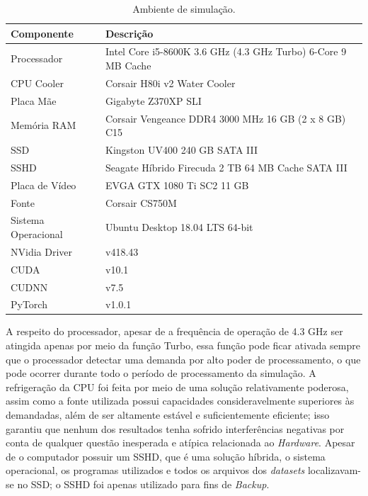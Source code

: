 \begin{table}[H]
    \centering
    \caption{Ambiente de simulação.}
    \begin{tabular}{ll}
        \toprule
        \textbf{Componente} &   \textbf{Descrição}\\
        \midrule
        Processador         &   Intel Core i5-8600K 3.6 GHz (4.3 GHz Turbo) 6-Core 9 MB Cache\\
        \hline
        CPU Cooler          &   Corsair H80i v2 Water Cooler\\
        \hline
        Placa Mãe           &   Gigabyte Z370XP SLI\\
        \hline
        Memória RAM         &   Corsair Vengeance DDR4 3000 MHz 16 GB (2 
        x 8 GB) C15\\
        \hline
        SSD                 &   Kingston UV400 240 GB SATA III\\
        \hline
        SSHD                &   Seagate Híbrido Firecuda 2 TB 64 MB Cache 
        SATA III\\
        \hline
        Placa de Vídeo      &   EVGA GTX 1080 Ti SC2 11 GB\\
        \hline
        Fonte               &   Corsair CS750M\\
        \hline
        Sistema Operacional &   Ubuntu Desktop 18.04 LTS 64-bit\\
        \hline
        NVidia Driver       &   v418.43\\
        \hline
        CUDA                &   v10.1\\
        \hline
        CUDNN               &   v7.5\\
        \hline
        PyTorch             &   v1.0.1\\
        \bottomrule
    \end{tabular}
    \label{tab:results_pc_specs}
\end{table}

A respeito do processador, apesar de a frequência de operação de 4.3 GHz ser atingida apenas por meio da função Turbo, essa função pode ficar ativada sempre que o processador detectar uma demanda por alto poder de processamento, o que pode ocorrer durante todo o período de processamento da simulação. A refrigeração da CPU foi feita por meio de uma solução relativamente poderosa, assim como a fonte utilizada possui capacidades consideravelmente superiores às demandadas, além de ser altamente estável e suficientemente eficiente; isso garantiu que nenhum dos resultados tenha sofrido interferências negativas por conta de qualquer questão inesperada e atípica relacionada ao \textit{Hardware}. Apesar de o computador possuir um SSHD, que é uma solução híbrida, o sistema operacional, os programas utilizados e todos os arquivos dos \textit{datasets} localizavam-se no SSD; o SSHD foi apenas utilizado para fins de \textit{Backup}.

